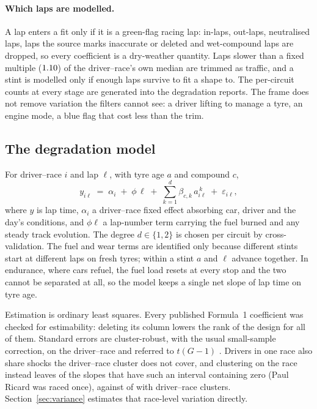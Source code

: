 \documentclass[11pt,a4paper]{article}
\begin{document}
\paragraph{Which laps are modelled.} A lap enters a fit only if it is a
green-flag racing lap: in-laps, out-laps, neutralised laps, laps the source
marks inaccurate or deleted and wet-compound laps are dropped, so every
coefficient is a dry-weather quantity. Laps slower than a fixed multiple
($1.10{}$) of the driver--race's own median are trimmed as traffic,
and a stint is modelled only if enough laps survive to fit a shape to. The
per-circuit counts at every stage are generated into the degradation reports.
The frame does not remove variation the filters cannot see: a driver lifting to
manage a tyre, an engine mode, a blue flag that cost less than the trim.

\subsection{The degradation model}

For driver--race $i$ and lap $\ell$, with tyre age $a$ and compound $c$,
%
\begin{equation}
y_{i\ell} \;=\; \alpha_i \;+\; \phi\,\ell \;+\; \sum_{k=1}^{d}\beta_{c,k}\,a_{i\ell}^{\,k} \;+\; \varepsilon_{i\ell},
\label{eq:degradation}
\end{equation}
%
where $y$ is lap time, $\alpha_i$ a driver--race fixed effect absorbing car,
driver and the day's conditions, and $\phi\ell$ a lap-number term carrying the
fuel burned and any steady track evolution. The degree $d \in \{1,2\}$ is chosen
per circuit by cross-validation. The fuel and wear terms are identified only
because different stints start at different laps on fresh tyres; within a stint
$a$ and $\ell$ advance together. In endurance, where cars refuel, the fuel load
resets at every stop and the two cannot be separated at all, so the model keeps
a single net slope of lap time on tyre age.

Estimation is ordinary least squares. Every published Formula~1 coefficient was
checked for estimability: deleting its column lowers the rank of the design for
all \EstChecked{} of them. Standard errors are cluster-robust, with the usual small-sample
correction, on the driver--race and referred to $t(G-1)$ \citep{cameron2015}. Drivers in one race
also share shocks the driver--race cluster does not cover, and clustering on the
race instead leaves \RaceClusterZero{} of the \RaceClusterNRace{} slopes that
have such an interval containing zero (Paul Ricard was raced once), against
\RaceClusterZeroDr{} of \RaceClusterN{} with driver--race clusters. Section~\ref{sec:variance}
estimates that race-level variation directly.
\end{document}
